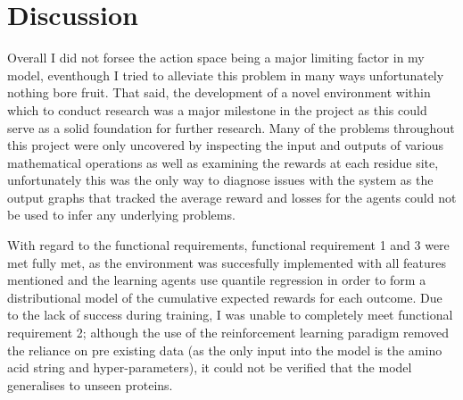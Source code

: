 \section{Discussion}
Overall I did not forsee the action space being a major limiting factor in
my model, eventhough I tried to alleviate this problem in many ways
unfortunately nothing bore fruit. That said, the development
of a novel environment within which to conduct research was 
a major milestone in the project as this could serve as a solid
foundation for further research. Many of the problems throughout
this project were only uncovered by inspecting the input and outputs of various mathematical 
operations as well as examining the rewards at each residue site, unfortunately
this was the only way to diagnose issues with the system as the output
graphs that tracked the average reward and losses for the agents could not
be used to infer any underlying problems.

With regard to the functional requirements, functional requirement 1
and 3 were met fully met, as the environment was succesfully implemented
with all features mentioned and the learning agents use quantile regression
in order to form a distributional model of the cumulative expected rewards for
each outcome. Due to the lack of success during training, I was unable to completely meet
functional requirement 2; although the use of the reinforcement learning
paradigm removed the reliance on pre existing data (as the only input into the model
is the amino acid string and hyper-parameters), it could not be verified that
the model generalises to unseen proteins.

